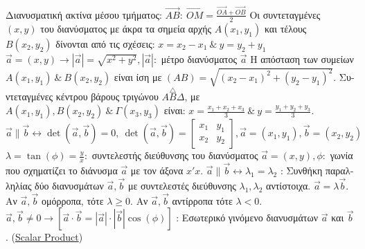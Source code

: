 \documentclass[12pt]{article}
\begin{document}
\begin{flushleft}
	\textbullet \quad \textgreek{Διανυσματική ακτίνα μέσου τμήματος: } $ \vec{AB}: \ \vec{OM} = \frac{\vec{OA} + \vec{OB}}{2} $ \linebreak 
	\textbullet \quad \textgreek{Οι συντεταγμένες} $(x,y)$ \textgreek{του διανύσματος με άκρα τα σημεία αρχής} $A(x_1, y_1)$ \textgreek{και τέλους} $B(x_2,y_2)$ \textgreek{δίνονται από τις σχέσεις:} $x = x_2 -x_1\ \text{\&}\ y = y_2 + y_1 $ \linebreak 
	\textbullet \quad $ \vec{a} = (x,y) \rightarrow |\vec{a}| = \sqrt{x^2 +y^2}, |\vec{a}|: $ \textgreek{μέτρο διανύσματος} $ \vec{a}$ \linebreak 
	\textbullet \quad \textgreek{Η απόσταση των συμείων} $A(x_1, y_1)\ \text{\&}\ B(x_2, y_2) $ \textgreek{είναι ίση με} $(AB) = \sqrt{(x_2-x_1)^2 + (y_2 -y_1)^2} .$ \linebreak 
	\textbullet \quad \textgreek{Συντεταγμένες κέντρου βάρους τριγώνου} $A\overset{\triangle}{B}\Delta$, \textgreek{με} $A(x_1, y_1), B(x_2, y_2)\ \text{\&}\ \Gamma(x_3, y_3) $ \textgreek{είναι}: $\displaystyle x = \frac{x_1 + x_2 + x_3}{3}\ \text{\&}\ y = \frac{y_1 + y_2 + y_3}{3} . $ \linebreak  
	\textbullet \quad $\displaystyle  \vec{a} \parallel \vec{b} \leftrightarrow \det(\vec{a}, \vec{b}) = 0 , \ \det(\vec{a}, \vec{b}) = \begin{bmatrix} 
	x_1 & y_1 \\ 
	x_2 & y_2	
\end{bmatrix}, \vec{a} = (x_1, y_1), \vec{b} = (x_2, y_2) $ \linebreak 
	\textbullet \quad $ \lambda = \tan (\phi) = \frac{y}{x}: $ \textgreek{συντελεστής διεύθυνσης του διανύσματος} $ \vec{a} = (x,y), \phi: $ \textgreek{γωνία που σχηματίζει το διάνυσμα} $ \vec{a}$ \textgreek{με τον άξονα} $x'x$. \linebreak 
	\textbullet \quad $ \vec{a} \parallel \vec{b} \leftrightarrow \lambda_1 = \lambda_2 $  :  \textgreek{Συνθήκη παραλληλίας δύο διανυσμάτων} $ \vec{a}, \vec{b}$ \textgreek{με συντελεστές διεύθυνσης} $\lambda_1, \lambda_2$ \textgreek{αντίστοιχα}. \linebreak 
	\textbullet \quad $ \vec{a} = \lambda \vec{b} $. \textgreek{Αν} $ \vec{a}, \vec{b}$ \textgreek{ομόρροπα, τότε} $\lambda \geq 0$. \textgreek{Αν} $ \vec{a}, \vec{b}$ \textgreek{αντίρροπα τότε} $\lambda < 0$. \linebreak 
	\textbullet \quad $ \vec{a}, \vec{b} \neq 0 \rightarrow \left[ \vec{a} \cdot \vec{b} = | \vec{a} | \cdot |\vec{b}| \cos (\phi) \right] $ \textgreek{: Εσωτερικό γινόμενο διανυσμάτων} $ \vec{a} $ \textgreek{και} $ \vec{b}$. (\uline{Scalar Product}) \linebreak 

\end{flushleft}
\end{document}
